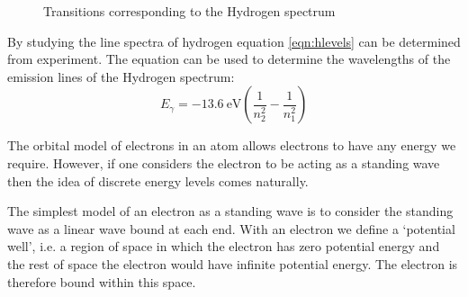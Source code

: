 \documentclass[revision-guide.tex]{subfiles}
\begin{document}
\begin{figure}
  \begin{center}
  \end{center}
  \caption{Transitions corresponding to the Hydrogen spectrum}
  \label{fig:hspec}
\end{figure}


By studying the line spectra of hydrogen equation \ref{eqn:hlevels} can be determined from experiment. The equation can be used to determine the wavelengths of the emission lines of the Hydrogen spectrum:
\[ E_\gamma = \SI{-13.6}{\electronvolt}\left(\frac{1}{n_2^2}-\frac{1}{n_1^2}\right) \]


The orbital model of electrons in an atom allows electrons to have any energy we require. However, if one considers the electron to be acting as a standing wave then the idea of discrete energy levels comes naturally.

The simplest model of an electron as a standing wave is to consider the standing wave as a linear wave bound at each end. With an electron we define a `potential well', i.e. a region of space in which the electron has zero potential energy and the rest of space the electron would have infinite potential energy. The electron is therefore bound within this space.
\end{document}
